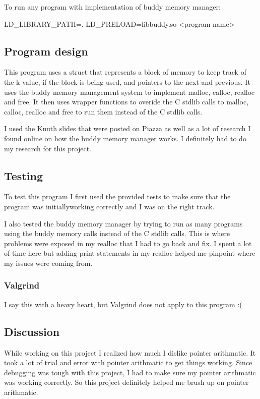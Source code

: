 To run any program with implementation of buddy memory manager\+: \begin{DoxyVerb}       LD_LIBRARY_PATH=. LD_PRELOAD=libbuddy.so <program name>
\end{DoxyVerb}


\subsection*{Program design}

This program uses a struct that represents a block of memory to keep track of the k value, if the block is being used, and pointers to the next and previous. It uses the buddy memory management system to implement malloc, calloc, realloc and free. It then uses wrapper functions to overide the C stdlib calls to malloc, calloc, realloc and free to run them instead of the C stdlib calls.

I used the Knuth slides that were posted on Piazza as well as a lot of research I found online on how the buddy memory manager works. I definitely had to do my research for this project.

\subsection*{Testing}

To test this program I first used the provided tests to make sure that the program was initiallyworking correctly and I was on the right track.

I also tested the buddy memory manager by trying to run as many programs using the buddy memory calls instead of the C stdlib calls. This is where problems were exposed in my realloc that I had to go back and fix. I spent a lot of time here but adding print statements in my realloc helped me pinpoint where my issues were coming from.

\subsubsection*{Valgrind}

I say this with a heavy heart, but Valgrind does not apply to this program \+:(

\subsection*{Discussion}

While working on this project I realized how much I dislike pointer arithmatic. It took a lot of trial and error with pointer arithmatic to get things working. Since debugging was tough with this project, I had to make sure my pointer arithmatic was working correctly. So this project definitely helped me brush up on pointer arithmatic.


